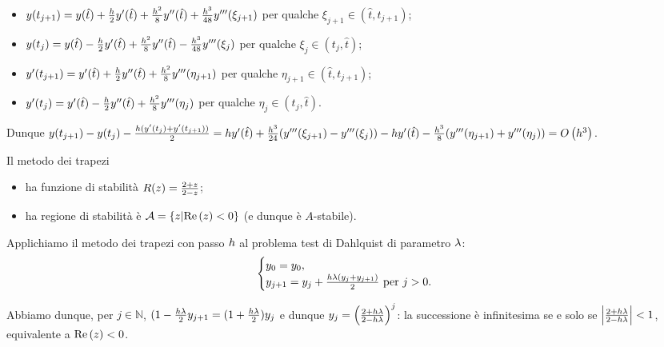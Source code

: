 \begin{itemize}
	\item $y(t_{j + 1}) = y(\hat{t}) + \frac{h}{2} y'(\hat{t}) + \frac{h^2}{8}y''(\hat{t}) + \frac{h^3}{48}y'''(\xi_{j + 1})$ per qualche $\xi_{j + 1} \in (\hat{t},t_{j + 1})$;
	\item $y(t_j) = y(\hat{t}) - \frac{h}{2} y'(\hat{t}) + \frac{h^2}{8}y''(\hat{t}) - \frac{h^3}{48}y'''(\xi_j)$ per qualche $\xi_j \in (t_j,\hat{t})$;
	\item $y'(t_{j + 1}) = y'(\hat{t}) + \frac{h}{2} y''(\hat{t}) + \frac{h^2}{8}y'''(\eta_{j + 1})$ per qualche $\eta_{j + 1} \in (\hat{t},t_{j + 1})$;
	\item $y'(t_j) = y'(\hat{t}) - \frac{h}{2} y''(\hat{t}) + \frac{h^2}{8}y'''(\eta_j)$ per qualche $\eta_j \in (t_j,\hat{t})$.
\end{itemize}
\par Dunque $y(t_{j + 1}) - y(t_j) - \frac{h (y'(t_j) + y'(t_{j + 1}))}{2} = h y'(\hat{t}) + \frac{h^3}{24}(y'''(\xi_{j + 1}) - y'''(\xi_j)) - h y'(\hat{t}) - \frac{h^3}{8}(y'''(\eta_{j + 1}) + y'''(\eta_j)) = O \left ( h^3 \right )$. \EndProof
\begin{Theorem}
	Il metodo dei trapezi
	\begin{itemize}
		\item ha funzione di stabilit\`a $R(z) = \frac{2 + z}{2 - z}$;
		\item ha regione di stabilit\`a \`e $\mathcal{A} = \lbrace z | \text{Re} \left ( z \right ) < 0 \rbrace$ (e dunque \`e $A$-stabile).
	\end{itemize}
\end{Theorem}
\Proof Applichiamo il metodo dei trapezi con passo $h$ al problema test di Dahlquist di parametro $\lambda$: 
\[
\begin{cases}
	y_0 = y_0,\\
	y_{j + 1} = y_j + \frac{h \lambda (y_j +  y_{j + 1})}{2}\text{ per }j > 0.
\end{cases}
\]
\par Abbiamo dunque, per $j \in \mathbb{N}$, $(1 - \frac{h\lambda}{2} y_{j + 1} = (1 + \frac{h \lambda}{2})y_j$ e dunque $y_j = \left ( \frac{2 + h \lambda}{2 - h\lambda} \right )^j$: la successione \`e infinitesima se e solo se $\left \lvert \frac{2 + h \lambda}{2 - h\lambda} \right \rvert < 1$, equivalente a $\text{Re} \left ( z \right ) < 0$. \EndProof
